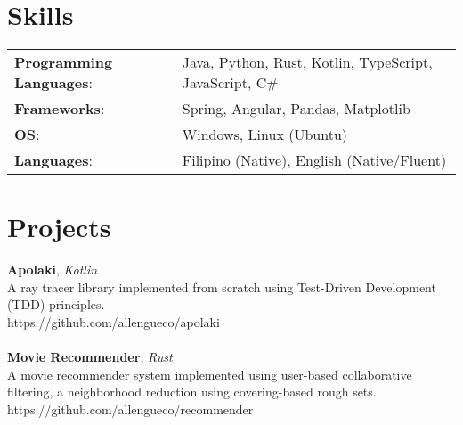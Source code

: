 \documentclass[line,margin]{res}
\begin{document}
\begin{resume}
	\section{Skills}
	\begin{tabular}{@{}ll}
		\textbf{Programming Languages}: & Java, Python, Rust, Kotlin, TypeScript, JavaScript, C\# \\
		\textbf{Frameworks}:            & Spring, Angular, Pandas, Matplotlib                     \\
		\textbf{OS}:                    & Windows, Linux (Ubuntu)                                 \\
		\textbf{Languages}:             & Filipino (Native), English (Native/Fluent)              \\
	\end{tabular}
	\section{Projects}
	\textbf{Apolaki}, {\sl Kotlin}\\ A ray tracer library implemented from scratch using Test-Driven Development (TDD) principles.\\ https://github.com/allengueco/apolaki\\\\
	\textbf{Movie Recommender}, {\sl Rust}\\ A movie recommender system implemented using user-based collaborative filtering, a neighborhood reduction using covering-based rough sets.\\ https://github.com/allengueco/recommender\\\\
\end{resume}
\end{document}
